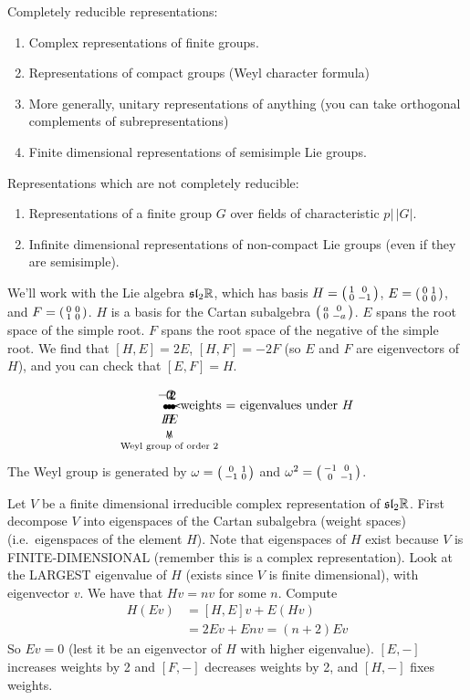  Completely reducible representations:
 \begin{enumerate}
   \item Complex representations of finite groups.

   \item Representations of compact groups (Weyl character formula)

   \item More generally, unitary representations of anything (you can take orthogonal
   complements of subrepresentations)

   \item Finite dimensional representations of semisimple Lie groups.
 \end{enumerate}
 Representations which are not completely reducible:
 \begin{enumerate}
   \item Representations of a finite group $G$  over fields of characteristic
   $p|\,|G|$.

   \item Infinite dimensional representations of non-compact Lie groups (even if they
   are semisimple).
 \end{enumerate}

 We'll work with the Lie algebra $\mathfrak{sl}_2\mathbb{R}$, which has basis $H=\left( \begin{smallmatrix} 1 & 0 \\ 0 & -1 \end{smallmatrix} \right)$,
 $E=\left( \begin{smallmatrix} 0 & 1 \\ 0 & 0 \end{smallmatrix} \right)$, and $F=\left( \begin{smallmatrix} 0 & 0 \\ 1 & 0 \end{smallmatrix} \right)$. $H$ is a basis for the Cartan subalgebra
 $\left( \begin{smallmatrix} a & 0 \\ 0 & -a \end{smallmatrix} \right)$. $E$ spans the root space of the simple root. $F$ spans the root
 space of the negative of the simple root. We find that $[H,E]=2E$, $[H,F]=-2F$ (so
 $E$ and $F$ are eigenvectors of $H$), and you can check that $[E,F]=H$.
 \[\begin{xy}
   (1,0) *++!D{0} *++!U{H} *{\bullet};
   \ar@/^2.5em/@{<->}^{\text{Weyl group of order 2}}(0,0) *++!D{-2} *{\bullet} *++!U{F};
   (2,0) *++!D{2} *{\bullet} *++!U{E};
   \ar (3,.3) *+!L{\text{weights $=$ eigenvalues under }H};(2.2,.3)
 \end{xy}\]
 The Weyl group is generated by $\omega = \left( \begin{smallmatrix} 0 & 1 \\ -1 & 0 \end{smallmatrix} \right)$ and $\omega^2=\left( \begin{smallmatrix} -1 & 0 \\ 0 & -1 \end{smallmatrix} \right)$.

 Let $V$ be a finite dimensional irreducible complex representation of $\mathfrak{sl}_2\mathbb{R}$.
 First decompose $V$ into eigenspaces of the Cartan subalgebra (weight spaces) (i.e.\
 eigenspaces of the element $H$). Note that eigenspaces of $H$ exist because $V$ is
 FINITE-DIMENSIONAL (remember this is a complex representation). Look at the LARGEST
 eigenvalue of $H$ (exists since $V$ is finite dimensional), with eigenvector $v$. We
 have that $Hv=nv$ for some $n$. Compute
 \begin{align*}
   H(Ev) &= [H,E]v + E(Hv)\\
        &= 2Ev + Env = (n+2)Ev
 \end{align*}
 So $Ev=0$ (lest it be an eigenvector of $H$ with higher eigenvalue). $[E,-]$
 increases weights by 2 and $[F,-]$ decreases weights by 2, and $[H,-]$ fixes weights.


